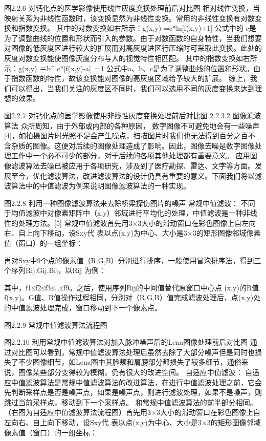 图2.2.6 对钙化点的医学影像使用线性灰度变换处理前后对比图
相对线性变换，当映射关系为非线性函数时，该变换显然为非线性变换。常用的非线性变换有对数变换和指数变换。
其中的对数变换如右所示：g(x,y) =c*ln[f(x,y)+1] 
公式中的 c是为了调整曲线的位置和形状而引入的参数。由于对数函数的自身特性，当我们想要对图像的低灰度区进行较大的扩展而对高灰度进区行压缩时可采取此变换。此处的灰度对数变换能使图像灰度分布与人的视觉特性相匹配。
其中的指数变换如右所示：g(x,y) ＝b^ {c*[f(x,y)-a] －1}
公式中a、b、c是为了调整曲线的位置和形状。由于指数函数的特性，故该变换能对图像的高灰度区域给予较大的扩展。
	综上，我们可以得出，当我们关注的灰度区不同时，我们可以选用不同的灰度变换来达到理想的效果。

图2.2.7 对钙化点的医学影像使用非线性灰度变换处理前后对比图
2.2.3.2 图像滤波算法
众所周知，由于外部或内部的各种原因， 数字图像不可避免地会有一些噪声[4]，如拍摄图片时光照不足会产生噪点，扫描图片时我们也无法得到百分之百不含杂质的图像。这便对后续的图像处理造成了影响。因此，图像去噪是数字图像处理工作中一个必不可少的部分，对于后续的各项其他处理都有重要意义。 应用图像滤波算法去噪已被应用于各项研究，涉及到了医疗勘探、雷达、文字等方面。发展至今，优化滤波算法，改进滤波算法的设计仍具有重要的意义。下面我们将以滤波算法中的中值滤波为例来说明图像滤波算法的一种实现。

图2.2.8 利用一种图像滤波算法来去除桥梁探伤图片的噪声
常规中值滤波：
不同于均值滤波中对像素矩阵中（x,y）邻域进行平均化的处理，中值滤波是一种非线性的处理方法。[5]
	  常规中值滤波首先用3×3大小的滑动窗口在彩色图像上自左向右、自上向下移动，设Sxy代 表以点(x,y)为中心、大小是3×3的矩形图像邻域像素值（窗口）的一组坐标：

再对Sxy中9个点的像素值（R,G,B）分别进行排序，一般使用冒泡排序法，得到三个序列Rij,Gij,Bij，以Rij 为例：

其中，f1≤f2≤f3≤…≤f9。之后，使用序列Rij的中间值替代原窗口中心点 (x,y)的R值f(x,y)。G值、B值操作过程相同，分别对（R,G,B）值完成滤波处理后，点(x,y)处的中值滤波处理完成，窗口移动到下一个像素点。

图2.2.9 常规中值滤波算法流程图

图2.2.10 利用常规中值滤波算法对加入脉冲噪声后的Lena图像处理前后对比图
通过对比图可以看到，常规中值滤波算法处理后虽然去除了大部分噪声但是同时也损失了不少图像细节，如Lena图中其脸颊和肩膀部分都损失了较多细节，通俗来说，图像某些部分变得较为模糊，仍有很大的改进空间。
自适应中值滤波：
自适应中值滤波算法是常规中值滤波算法的改进算法，在进行中值滤波处理之前，它会先判断采样点是否是噪声点，如果是噪声点，则进行滤波处理，如果不是噪声，则跳过当前采样点，移动到下一个采样点。
	和常规中值滤波算法的前半部分相同。（右图为自适应中值滤波算法流程图）首先用3×3大小的滑动窗口在彩色图像上自左向右、自上向下移动，设Sxy代 表以点(x,y)为中心、大小是3×3的矩形图像邻域像素值（窗口）的一组坐标：

